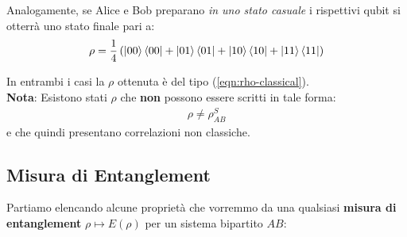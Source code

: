 \documentclass[../../InformazioneQuantistica.tex]{subfiles}
\begin{document}
Analogamente, se Alice e Bob preparano \textit{in uno stato casuale} i rispettivi qubit si otterrà uno stato finale pari a:
\begin{align*}
\rho=\frac{1}{4}\left(\Ket{00}\Bra{00} + \Ket{01}\Bra{01} + \Ket{10}\Bra{10} + \Ket{11}\Bra{11}\right)
\end{align*}

In entrambi i casi la $\rho$ ottenuta è del tipo (\ref{eqn:rho-classical}).\\

\textbf{Nota}: Esistono stati $\rho$ che \textbf{non} possono essere scritti in tale forma:
\begin{align*}
\rho \neq \rho_{AB}^S
\end{align*}
e che quindi presentano correlazioni non classiche.

\subsection{Misura di Entanglement} 
Partiamo elencando alcune proprietà che vorremmo da una qualsiasi \textbf{misura di entanglement} $\rho \mapsto E(\rho)$ \cite{relative-entropy} per un sistema bipartito $AB$: 
\end{document}
